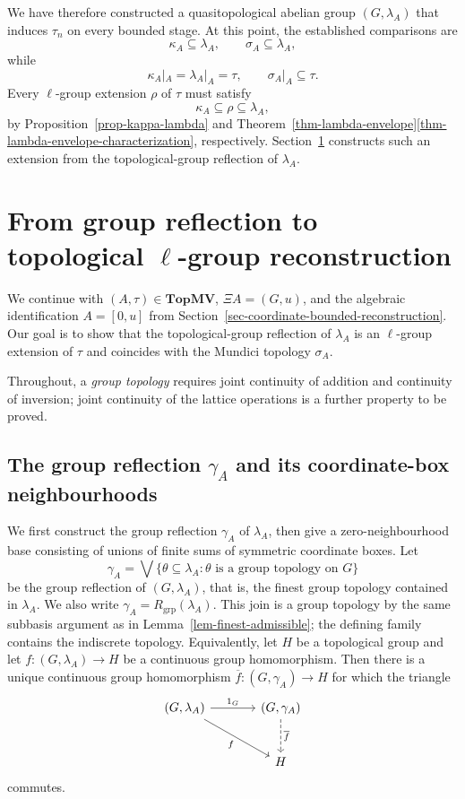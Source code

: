 \documentclass[preprint,3p]{elsarticle}
\theoremstyle{plain}
\theoremstyle{definition}
\newcommand{\TopMV}{\mathbf{TopMV}}
\numberwithin{equation}{section}
\begin{document}
We have therefore constructed a quasitopological abelian
group $(G,\lambda_A)$ that induces $\tau_n$ on every
bounded stage.  At this point, the established
comparisons are
\[
 \kappa_A\subseteq\lambda_A,\qquad
 \sigma_A\subseteq\lambda_A,
\]
while
\[
 \kappa_A|_A=\lambda_A|_A=\tau,\qquad
 \sigma_A|_A\subseteq\tau.
\]
Every $\ell$-group extension $\rho$ of $\tau$ must satisfy
\[
 \kappa_A\subseteq\rho\subseteq\lambda_A,
\]
by Proposition~\ref{prop-kappa-lambda} and
Theorem~\ref{thm-lambda-envelope}\ref{thm-lambda-envelope-characterization},
respectively.
Section~\ref{sec-group-envelope} constructs such an extension
from the topological-group reflection of $\lambda_A$.

\section{From group reflection to topological
\texorpdfstring{$\ell$}{l}-group reconstruction}
\label{sec-group-envelope}

We continue with $(A,\tau)\in\TopMV$, $\Xi A=(G,u)$, and the
algebraic identification $A=[0,u]$ from
Section~\ref{sec-coordinate-bounded-reconstruction}.
Our goal is to show that the topological-group reflection of
$\lambda_A$ is an $\ell$-group extension of $\tau$ and coincides
with the Mundici topology $\sigma_A$.

Throughout, a \emph{group topology} requires joint continuity of
addition and continuity of inversion; joint continuity of the
lattice operations is a further property to be proved.

\subsection{The group reflection
\texorpdfstring{$\gamma_A$}{gamma\_A} and its coordinate-box neighbourhoods}
\label{subsec-bounded-control-machinery}

We first construct the group reflection $\gamma_A$ of $\lambda_A$,
then give a zero-neighbourhood base consisting of unions of finite
sums of symmetric coordinate boxes.  Let
\begin{equation}
\label{eq-gamma-A-def}
\gamma_A=\bigvee\{\theta\subseteq\lambda_A:
   \theta\text{ is a group topology on }G\}
\end{equation}
be the group reflection of
$(G,\lambda_A)$, that is, the finest group topology contained
in $\lambda_A$.  We also write
$\gamma_A=R_{\mathrm{grp}}(\lambda_A)$.  This join is a group topology by the same
subbasis argument as in Lemma~\ref{lem-finest-admissible};
the defining family contains the indiscrete topology.  Equivalently, let $H$ be
a topological group and let $f\colon(G,\lambda_A)\longrightarrow H$ be a 
continuous group homomorphism.  Then there is a unique continuous
group homomorphism $\overline f\colon(G,\gamma_A)\longrightarrow H$
for which the triangle
\[
\begin{tikzcd}[column sep=large,row sep=large]
(G,\lambda_A)
  \arrow[r,"1_G"]
  \arrow[dr,"f"']
&
(G,\gamma_A)
  \arrow[d,dashed,"\overline f"]
\\
&
H
\end{tikzcd}
\]
commutes.
\end{document}
